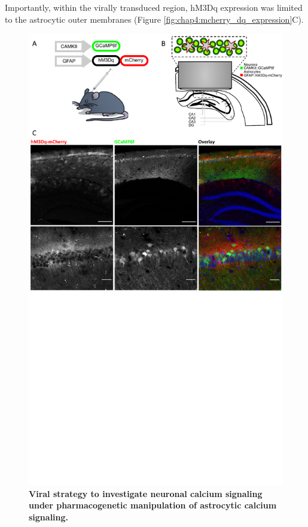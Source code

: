 Importantly, within the virally transduced region, hM3Dq expression was limited to the astrocytic outer membranes (Figure \ref{fig:chap4:mcherry_dq_expression}C).
\begin{figure}[h!]
    \centering
    \includegraphics[trim={0 300 0 0},clip,width=\textwidth]{Figures/Chapter4/Pedro_fig5.pdf}
    \caption[Viral strategy to investigate neuronal calcium signaling under pharmacogenetic manipulation of astrocytic calcium signaling.]{\textbf{Viral strategy to investigate neuronal calcium signaling under pharmacogenetic manipulation of astrocytic calcium signaling.} 
}
\end{figure}
